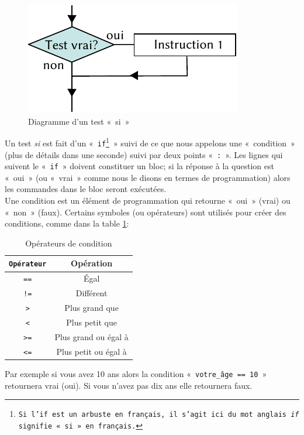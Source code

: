 \begin{figure}[ht]
\centering
\includegraphics[scale=1.5]{images/Cf-if-fr.pdf}
\caption{Diagramme d'un test «~si~»}
\label{fig:Cf-if-fr}
\end{figure}

Un test \emph{si} est fait d'un «~\texttt{if\footnote{Si l'if est un arbuste en français, il s'agit ici du mot anglais \emph{if} signifie «~si~» en français.}}~» suivi de ce que nous appelons une «~condition~»  (plus de  détails dans une seconde) suivi par deux points «~\verb+:+~». Les lignes qui suivent le «~\texttt{if}~» doivent constituer un bloc; si la réponse à la question est «~oui~» (ou «~vrai~» comme nous le disons en termes de programmation) alors les commandes dans le bloc seront exécutées.\\

Une condition est un élément de programmation qui retourne «~oui~» (vrai) ou «~non~» (faux). Certains symboles (ou opérateurs) sont utilisés pour créer des conditions, comme dans la table \ref{table:opcond}:

\begin{table}[h!]
\begin{center}
\begin{tabular}{|c|c|}
\hline
\texttt{Opérateur}&Opération\\
\hline
\texttt{==}&Égal\\
\hline
\texttt{!=}&Différent\\
\hline
\texttt{>}&Plus grand que\\
\hline
\texttt{<}&Plus petit que\\
\hline
\texttt{>=}&Plus grand ou égal à\\
\hline
\texttt{<=}&Plus petit ou égal à\\
\hline
\end{tabular}
\end{center}
\caption{Opérateurs de condition}
\label{table:opcond}
\end{table}

Par exemple si vous avez 10 ans alors la condition «~\texttt{votre\_âge == 10}~» retournera vrai (oui). Si vous n'avez pas dix ans  elle retournera faux. \\

